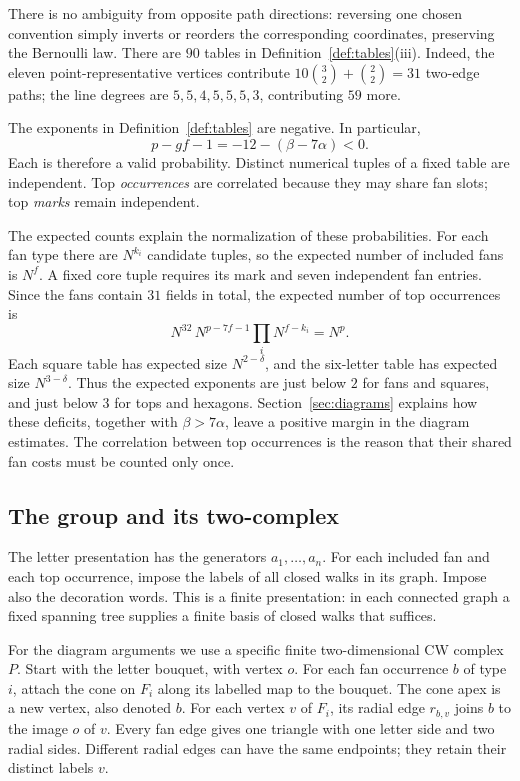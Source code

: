 There is no ambiguity from opposite path directions: reversing one chosen convention simply inverts or reorders the corresponding coordinates, preserving the Bernoulli law. There are $90$ tables in Definition~\ref{def:tables}\textup{(iii)}. Indeed, the eleven point-representative vertices contribute $10\binom32+\binom22=31$ two-edge paths; the line degrees are $5,5,4,5,5,5,3$, contributing $59$ more.

The exponents in Definition~\ref{def:tables} are negative. In particular,
\[
 p-gf-1=-12-(\beta-7\alpha)<0.
\]
Each is therefore a valid probability. Distinct numerical tuples of a fixed table are independent. Top \emph{occurrences} are correlated because they may share fan slots; top \emph{marks} remain independent.

The expected counts explain the normalization of these probabilities.
For each fan type there are $N^{k_i}$ candidate tuples, so the expected
number of included fans is $N^f$. A fixed core tuple requires its mark
and seven independent fan entries. Since the fans contain $31$ fields
in total, the expected number of top occurrences is
\[
 N^{32}\,N^{p-7f-1}\prod_i N^{f-k_i}=N^p.
\]
Each square table has expected size $N^{2-\delta}$, and the six-letter
table has expected size $N^{3-\delta}$. Thus the expected exponents
are just below $2$ for fans and squares, and just below $3$ for tops
and hexagons. Section~\ref{sec:diagrams} explains how these deficits,
together with $\beta>7\alpha$, leave a positive margin in the diagram
estimates. The correlation between top occurrences is the
reason that their shared fan costs must be counted only once.

\subsection{The group and its two-complex}
The letter presentation has the generators $a_1,\ldots,a_n$. For each included fan and each top occurrence, impose the labels of all closed walks in its graph. Impose also the decoration words. This is a finite presentation: in each connected graph a fixed spanning tree supplies a finite basis of closed walks that suffices.

For the diagram arguments we use a specific finite two-dimensional CW complex $P$. Start with the letter bouquet, with vertex $o$. For each fan occurrence $b$ of type $i$, attach the cone on $F_i$ along its labelled map to the bouquet. The cone apex is a new vertex, also denoted $b$. For each vertex $v$ of $F_i$, its radial edge $r_{b,v}$ joins $b$ to the image $o$ of $v$. Every fan edge gives one triangle with one letter side and two radial sides. Different radial edges can have the same endpoints; they retain their distinct labels $v$.

